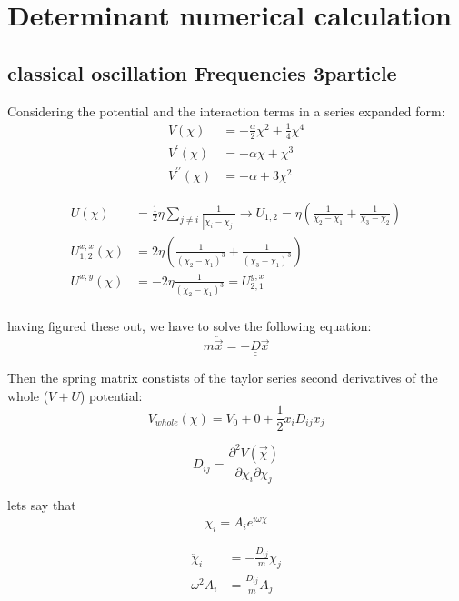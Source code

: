 \documentclass[12pt,a4paper]{article}
\numberwithin{equation}{section}
\begin{document}
\section{Determinant numerical calculation}

\subsection{classical oscillation Frequencies 3particle}
Considering the potential and the interaction terms in a series expanded form:
\begin{align}
V(\chi) &= -\frac{\alpha}{2}\chi^2 + \frac{1}{4}\chi^4 \\
V^\prime (\chi) &= -\alpha \chi + \chi^3\\
V^{\prime\prime} (\chi) &= -\alpha + 3\chi^2
\end{align}

\begin{align}
U(\chi) &= \frac{1}{2}\eta \sum_{j\neq i} \frac{1}{|\chi_i - \chi_j|} \rightarrow U_{1,2} = \eta \left( \frac{1}{\chi_2 - \chi_1} + \frac{1}{\chi_3 - \chi_2}  \right)\\
U^{x,x}_{1,2} (\chi) &= 2\eta \left(\frac{1}{(\chi_2 - \chi_1 )^3} +\frac{1}{(\chi_3 - \chi_1 )^3} \right) \\
U^{x,y} (\chi) &= -2\eta \frac{1}{(\chi_2 - \chi_1)^3} = U_{2,1}^{y,x}\\
\end{align}

having figured these out, we have to solve the following equation:
\begin{equation}
m\ddot{\vec{x}} = -\underline{\underline{D}} \vec{x}
\end{equation}

Then the spring matrix constists of the taylor series second derivatives of the whole ($V+U$) potential:
\begin{equation}
V_{whole} (\chi) = V_0 + 0 + \frac{1}{2}x_i D_{ij} x_j
\end{equation}

\begin{equation}
D_{ij} = \frac{\partial^2 V(\vec{\chi})}{\partial \chi_i \partial \chi_j}
\end{equation}

lets say that
\begin{equation}
\chi_i = A_i e^{i\omega \chi}
\end{equation}

\begin{align}
\ddot{\chi}_i &= -\frac{D_{ij}}{m} \chi_j\\
\omega^2 A_i &= \frac{D_{ij}}{m} A_j
\end{align}
\end{document}

